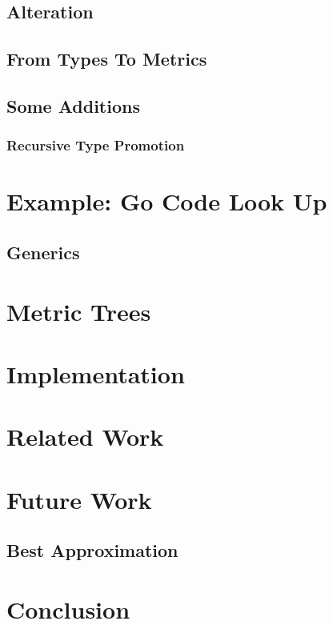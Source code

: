 \documentclass[12pt]{article}
\theoremstyle{plain}
\begin{document}
\subsection{Alteration}

\subsection{From Types To Metrics}

\subsection{Some Additions}
\subsubsection{Recursive Type Promotion}
\section{Example: Go Code Look Up}
\subsection{Generics}
\section{Metric Trees}

\section{Implementation}

\section{Related Work}
\section{Future Work}
\subsection{Best Approximation}
\section{Conclusion}



\end{document}
